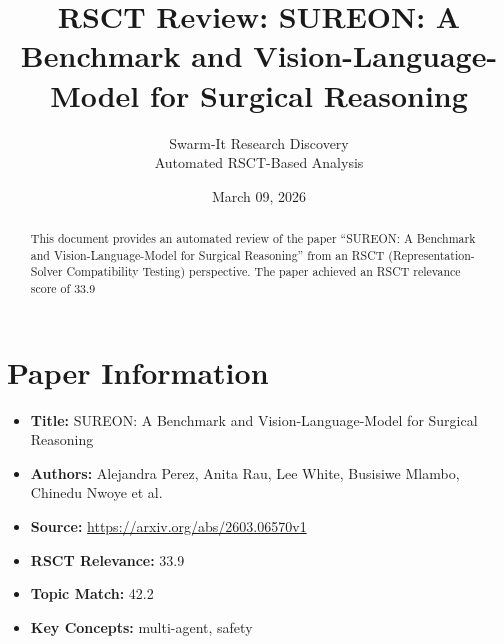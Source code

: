 \documentclass[11pt,a4paper]{article}
\title{RSCT Review: SUREON: A Benchmark and Vision-Language-Model for Surgical Reasoning}
\author{Swarm-It Research Discovery\\\small Automated RSCT-Based Analysis}
\date{March 09, 2026}
\begin{document}
\maketitle

\begin{abstract}
This document provides an automated review of the paper ``SUREON: A Benchmark and Vision-Language-Model for Surgical Reasoning'' from an RSCT (Representation-Solver Compatibility Testing) perspective. The paper achieved an RSCT relevance score of 33.9%
\end{abstract}

\section{Paper Information}
\begin{itemize}
\item \textbf{Title:} SUREON: A Benchmark and Vision-Language-Model for Surgical Reasoning
\item \textbf{Authors:} Alejandra Perez, Anita Rau, Lee White, Busisiwe Mlambo, Chinedu Nwoye et al.
\item \textbf{Source:} \url{https://arxiv.org/abs/2603.06570v1}
\item \textbf{RSCT Relevance:} 33.9%
\item \textbf{Topic Match:} 42.2%
\item \textbf{Key Concepts:} multi-agent, safety
\end{itemize}
\end{document}
